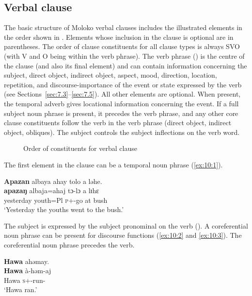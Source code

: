 \subsection{Verbal clause}\label{sec:10.1.1}
\hypertarget{RefHeading1212861525720847}{}
The basic structure of Moloko verbal clauses includes the illustrated elements in the order shown in . Elements whose inclusion in the clause is optional are in parentheses. The order of clause constituents for all clause types is always SVO (with V and O being within the verb phrase). The verb phrase () is the centre of the clause (and also its final element) and can contain information concerning the subject, direct object, indirect object, aspect, mood, direction, location, repetition, and discourse-importance of the event or state expressed by the verb (see Sections~\ref{sec:7.3}--\ref{sec:7.5}). All other elements are optional. When present, the temporal adverb gives locational information concerning the event. If a full subject noun phrase is present, it precedes the verb phrase, and any other core clause constituents follow the verb in the verb phrase (direct object, indirect object, obliques). The subject controls the subject inflections on the verb word. 
  
\begin{figure}
\caption{Order of constituents for verbal clause\label{fig:16}}
\end{figure}

The first element in the clause can be a temporal noun phrase (\ref{ex:10:1}).

\ea \label{ex:10:1}
\textbf{Apazan} albaya  ahay  tolo  a  ləhe.\\
\gll  \textbf{apazaŋ}  albaja=ahaj    tɔ-lɔ    a  lɪhɛ\\
      yesterday  youth=Pl      \textsc{p}+{\PFV}-go  at  bush\\
\glt  ‘Yesterday the youths went to the bush.’ 
\z

The subject is expressed by the subject pronominal on the verb (). A coreferential noun phrase can be present for discourse functions (\ref{ex:10:2} and \ref{ex:10:3}). The coreferential noun phrase precedes the verb.  

\ea \label{ex:10:2}
\textbf{Hawa}  ahəmay.\\
\gll  \textbf{Hawa}   à-həm-aj\\
      Hawa  \textsc{s}+{\PFV}-run{}-{\CL}\\
\glt  ‘Hawa ran.’
\z

